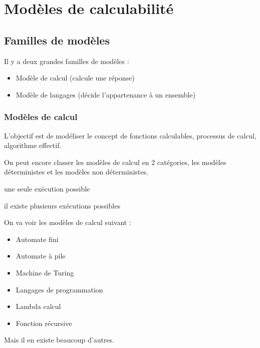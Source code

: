 
\chapter{Modèles de calculabilité}
\label{sec:mod_le_de_la_calculabilit_}

\section{Familles de modèles}
\label{sub:fammilles_de_mod_les}

Il y a deux grandes familles de modèles :
\begin{itemize}
	\item Modèle de calcul (calcule une réponse)
	\item Modèle de langages (décide l'appartenance à un ensemble)
\end{itemize}

\subsection{Modèles de calcul}
\label{ssub:mod_le_de_calcul}
L'objectif est de modéliser le concept de fonctions calculables, processus de
calcul, algorithme effectif.

On peut encore classer les modèles de calcul en 2 catégories, les
modèles déterministes et les modèles non déterministes.

\begin{mydef} une seule exécution possible
\end{mydef}

\begin{mydef} il existe plusieurs exécutions
	possibles
\end{mydef}

On va voir les modèles de calcul suivant :
\begin{itemize}
	\item Automate fini
	\item Automate à pile
	\item Machine de Turing
	\item Langages de programmation
	\item Lambda calcul
	\item Fonction récursive
\end{itemize}
Mais il en existe beaucoup d'autres.

